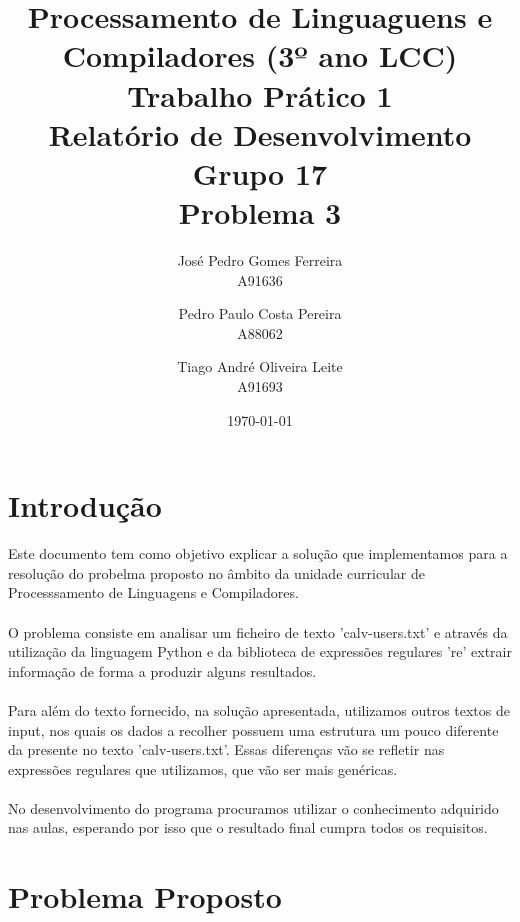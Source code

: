 \documentclass[11pt,a4paper]{report}%
\title{Processamento de Linguaguens e Compiladores (3º ano LCC)\\
       \textbf{Trabalho Prático 1}\\ Relatório de Desenvolvimento \\ \textbf{Grupo 17}\\ Problema 3
       } %
\author{José Pedro Gomes Ferreira\\ A91636 \\  \and Pedro Paulo Costa Pereira\\ A88062
         \and Tiago André Oliveira Leite\\ A91693
       } %
\date{\today} %
\begin{document}
\maketitle %


\tableofcontents %




\chapter{Introdução} \label{chap:intro} %

Este documento tem como objetivo explicar a solução que implementamos para a resolução do probelma proposto no âmbito da unidade curricular de Processsamento de Linguagens e Compiladores. \\ \\
O problema consiste em analisar um ficheiro de texto 'calv-users.txt' e através da utilização da linguagem Python e da biblioteca de expressões regulares 're' extrair informação de forma a produzir alguns resultados. \\ \\ Para além do texto fornecido, na solução apresentada, utilizamos outros textos de input, nos quais  os dados a recolher possuem uma estrutura um pouco diferente da presente no texto 'calv-users.txt'. Essas diferenças vão se refletir nas expressões regulares que utilizamos, que vão ser mais genéricas.\\ \\
No desenvolvimento do programa procuramos utilizar o conhecimento adquirido nas aulas, esperando por isso que o resultado final cumpra todos os requisitos.  





\chapter{Problema Proposto} \label{chap:ProbelemaProposto} %
\end{document}
